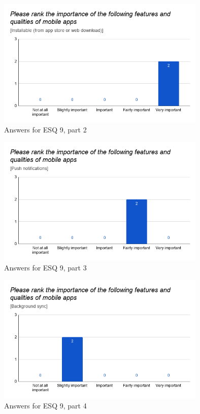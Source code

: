 \documentclass[a4paper,12pt]{article}
\begin{document}
\begin{figure}[ht!]
    \centering
    \includegraphics[width=10cm]{img/Results/esq9_2.png}
    \caption{Answers for ESQ 9, part 2}
    \label{fig:res_eduq9_2}
\end{figure}

\begin{figure}[ht!]
    \centering
    \includegraphics[width=10cm]{img/Results/esq9_3.png}
    \caption{Answers for ESQ 9, part 3}
    \label{fig:res_eduq9_3}
\end{figure}

\begin{figure}[ht!]
    \centering
    \includegraphics[width=10cm]{img/Results/esq9_4.png}
    \caption{Answers for ESQ 9, part 4}
    \label{fig:res_eduq9_4}
\end{figure}
\end{document}
